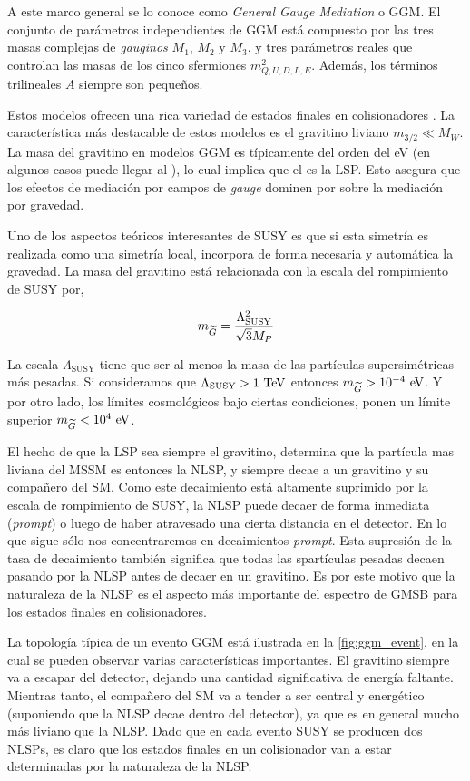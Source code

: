 A este marco general se lo conoce como \emph{General Gauge Mediation} o GGM. El
conjunto de parámetros independientes de GGM está compuesto por las tres masas
complejas de \emph{gauginos} $M_1$, $M_2$ y $M_3$, y tres parámetros reales que
controlan las masas de los cinco sfermiones $m^2_{Q,U,D,L,E}$. Además, los términos
trilineales $A$ siempre son pequeños.

Estos modelos ofrecen una rica variedad de estados finales en colisionadores
\cite{0911.4130}. La característica más destacable de estos modelos es el
gravitino liviano $m_{3/2} \ll M_W$. La masa del gravitino en modelos
GGM es típicamente del orden del eV (en algunos casos puede llegar al \gev), lo
cual implica que el {\gravino} es la LSP. Esto asegura que los efectos de
mediación por campos de \emph{gauge} dominen por sobre la mediación por gravedad.

Uno de los aspectos teóricos interesantes de SUSY es que si esta simetría es
realizada como una simetría local, incorpora de forma necesaria y automática la
gravedad.
La masa del gravitino está relacionada con la escala del rompimiento de SUSY por,

\begin{equation}
  m_{\widetilde{G}} = \frac{\Lambda^2_{\text{SUSY}}}{\sqrt{3}M_P}
\end{equation}

La escala $\Lambda_{\text{SUSY}}$ tiene que ser al menos la masa de las
partículas supersimétricas más pesadas. Si consideramos que
$\Lambda_{\text{SUSY}} > 1 \tev$ entonces $m_{\gravino} > 10^{-4} \eV$.
Y por otro lado, los límites cosmológicos \cite{PhysRevLett.48.223,Moroi:1993mb}
bajo ciertas condiciones, ponen un límite superior $m_{\gravino} < 10^4 \eV$.

El hecho de que la LSP sea siempre el gravitino, determina que la partícula mas
liviana del MSSM es entonces la NLSP, y siempre decae a un gravitino y su
compañero del SM. Como este decaimiento está altamente suprimido por la escala
de rompimiento de SUSY, la NLSP puede decaer de forma inmediata (\emph{prompt})
o luego de haber atravesado una cierta distancia en el detector. En lo que sigue
sólo nos concentraremos en decaimientos \emph{prompt}. Esta supresión de la tasa
de decaimiento también significa que todas las spartículas pesadas decaen
pasando por la NLSP antes de decaer en un gravitino. Es por este motivo que la
naturaleza de la NLSP es el aspecto más importante del espectro de GMSB para los
estados finales en colisionadores.

La topología típica de un evento GGM está ilustrada en la \cref{fig:ggm_event},
en la cual se pueden observar varias características importantes. El gravitino
siempre va a escapar del detector, dejando una cantidad significativa de energía
faltante. Mientras tanto, el compañero del SM va a tender a ser central y
energético (suponiendo que la NLSP decae dentro del detector), ya que es en
general mucho más liviano que la NLSP. Dado que en cada evento SUSY se producen
dos NLSPs, es claro que los estados finales en un colisionador van a estar
determinadas por la naturaleza de la NLSP.


